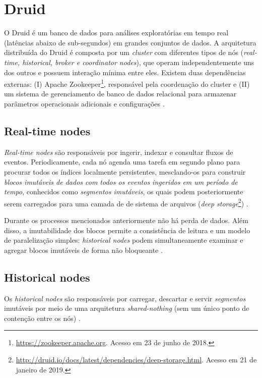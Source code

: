 \documentclass[
	12pt,				%
	oneside,			%
	a4paper,			%
	english,			%
	brazil				%
	]{abntex2ppgsi}
\begin{document}
{{\section{Druid}
\label{druid}

O Druid é um banco de dados para análises exploratórias em tempo real (latências abaixo de sub-segundos) em grandes conjuntos de dados. A arquitetura distribuída do Druid é composta por um \textit{cluster} com diferentes tipos de nós (\textit{real-time, historical, broker e coordinator nodes}), que operam independentemente uns dos outros e possuem interação mínima entre eles. Existem duas dependências externas: (I) Apache Zookeeper\footnote{\url{https://zookeeper.apache.org}. Acesso em 23 de junho de 2018.}, responsável pela coordenação do cluster e (II) um sistema de gerenciamento de banco de dados relacional  para armazenar parâmetros operacionais adicionais e configurações \cite{yang2014druid}.

\subsection{Real-time nodes}

\textit {Real-time nodes} são responsáveis por ingerir, indexar e consultar fluxos de eventos. Periodicamente, cada nó agenda uma tarefa em segundo plano para procurar todos os índices localmente persistentes, mesclando-os para construir \emph{blocos imutáveis de dados com todos os eventos ingeridos em um período de tempo}, conhecidos como \emph{segmentos imutáveis}, os quais podem posteriormente serem carregados para uma camada de de sistema de arquivos (\textit{deep storage}\footnote{\url{http://druid.io/docs/latest/dependencies/deep-storage.html}. Acesso em 21 de janeiro de 2019.}) \cite{yang2014druid}.

Durante os processos mencionados anteriormente não há perda de dados. Além disso, a imutabilidade dos blocos permite a consistência de leitura e um modelo de paralelização simples: \textit{historical nodes} podem simultaneamente examinar e agregar blocos imutáveis de forma não bloqueante \cite{yang2014druid}.

\subsection{Historical nodes}

Os \textit{historical nodes} são responsáveis por carregar, descartar e servir \emph{segmentos} imutáveis por meio de uma arquitetura \textit{shared-nothing} (sem um único ponto de contenção entre os nós) \cite{yang2014druid}.

}}
\end{document}
